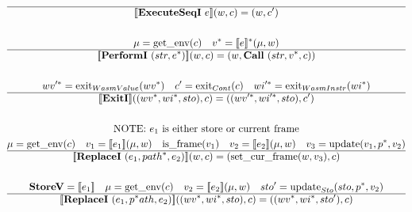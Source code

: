 \begin{gather*}
  \hline
  \sem{\executeseqi ~ e}(w, c) = (w, c') \\
%
\newline \\
  \mu = \getenv(c) \quad
  \seq v = \seq{\sem{e}}(\mu, w) \\
  \hline
  \sem{\performi ~ (str, \seq e)}(w, c) = (w, \call ~ (str, \seq v, c)) \\
%
\newline \\
  \seq{wv'} = \exit_{WasmValue}(\seq{wv}) \quad
  c' = \exit_{Cont}(c) \quad
  \seq{wi'} = \exit_{WasmInstr}(\seq{wi}) \\
  \hline
  \sem{\exiti}((\seq{wv}, \seq{wi}, sto), c)
  =
  ((\seq{wv'}, \seq{wi'}, sto), c') \\
%
\newline \\
\text{NOTE: $e_1$ is either store or current frame} \\
  \mu = \getenv(c) \quad
  v_1 = \sem{e_1}(\mu, w) \quad
  \isframe(v_1) \quad
  v_2 = \sem{e_2}(\mu, w) \quad
  v_3 = \update(v_1, \seq p, v_2) \\
  \hline
  \sem{\replacei ~ (e_1, \seq{path}, e_2)}(w, c)
  = (\setcurframe(w, v_3), c) \\
%
\newline \\
  \storev = \sem{e_1} \quad
  \mu = \getenv(c) \quad
  v_2 = \sem{e_2}(\mu, w) \quad
  sto' = \update_{Sto}(sto, \seq p, v_2) \\
  \hline
  \sem{\replacei ~ (e_1, \seq path, e_2)}((\seq{wv}, \seq{wi}, sto), c)
  = ((\seq{wv}, \seq{wi}, sto'), c) \\
\newline \\
\end{gather*}






